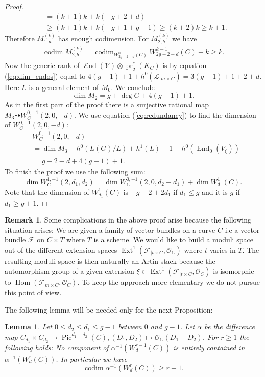 \documentclass[12pt]{extarticle}
\newtheorem{lemma}[theorem]{Lemma}
\theoremstyle{definition}
\newtheorem{remark}[theorem]{Remark}
\numberwithin{theorem}{section}
\newcommand{\OO}{\mathcal{O}}
\newcommand{\cL}{\mathcal{L}}
\newcommand{\cV}{\mathcal{V}}
\newcommand{\cF}{\mathcal{F}}
\newcommand{\op}{\operatorname}
\DeclareMathOperator{\End}{\mathcal{E}nd}
\begin{document}
\begin{proof}
\begin{align*}
&= (k+1)k + k(-g+2+d)\\
&\geq (k+1)k + k(-g+1+g-1)
\geq (k+2)k \geq k+1.
\end{align*}
Therefore $M^{(k)}_{1,a}$ has enough codimension. For $M^{(k)}_{2,b}$ we have
\begin{align*}
\op{codim} M^{(k)}_{2,b} = \op{codim}_{W^0_{2g-2-d}(C)}W^{k-1}_{2g-2-d}(C) + k \geq k.
\end{align*}
Now the generic rank of $\End(\cV)\otimes \op{pr}_2^*(K_C)$ is by equation (\ref{eq:dim_endos}) equal to $4(g-1) + 1 + h^0(\cL_{|m\times C}) = 3(g-1)+ 1 +2+d$. Here $L$ is a general element of $M_0$. We conclude
\begin{equation}
\dim M_2 = g +\deg G + 4(g-1)+1.
\end{equation}
As in the first part of the proof there is a surjective rational map $M_3 \dashrightarrow W_C^{0,-1}(2,0,-d)$. We use equation (\ref{eq:redundancy}) to find the dimension of $W_C^{0,-1}(2,0,-d)$:
\begin{align*}
&W_C^{0,-1}(2,0,-d) \\
&= \dim M_3 -h^0(L(G)/L)+h^1(L) -1 - h^0(\op{End}_0(V_\xi)) \\
&= g-2 - d + 4(g-1) + 1.
\end{align*}
To finish the proof we use the following sum: 
\begin{equation*}
	\dim W_C^{1,-1}(2,d_1,d_2) = \dim W_C^{0,-1}(2,0,d_2-d_1) + \dim W^1_{d_1}(C).
\end{equation*}
Note that the dimension of $W^1_{d_1}(C)$ is $-g-2+2d_1$ if $d_1 \leq g$ and it is $g$ if $d_1 \geq g+1$.
\end{proof}
\begin{remark}\label{remark:ext}
Some complications in the above proof arise because the following situation arises: We are given a family of vector bundles on a curve $C$ i.e a vector bundle $\cF$ on $C \times T$ where $T$ is a scheme. We would like to build a moduli space out of the different extension spaces $\op{Ext}^1(\cF_{|t \times C},\OO_{C})$ where $t$ varies in $T$. The resulting moduli space is then naturally an Artin stack because the automorphism group of a given extension $\xi \in \op{Ext}^1(\cF_{|t \times C},\OO_{C})$ is isomorphic to $\op{Hom}(\cF_{m\times C},\OO_C)$. To keep the approach more elementary we do not pursue this point of view.
\end{remark}
The following lemma will be needed only for the next Proposition:
\begin{lemma}\label{lemma:difference_loci}
Let $0\leq d_2\leq d_1\leq g-1$ between $0$ and $g-1$. Let $\alpha$ be the difference map $C_{d_1}\times C_{d_2}\to \op{Pic}^{d_1-d_2}(C), (D_1,D_2)\mapsto \OO_C(D_1-D_2)$. For $r\geq 1$ the following holds: No component of $\alpha^{-1}(W^{r-1}_d(C))$ is entirely contained in $\alpha^{-1}(W^r_d(C))$. In particular we have
 \begin{equation*}
\op{codim} \alpha^{-1}(W^r_d(C)) \geq r+1.
\end{equation*} 
\end{lemma}
\end{document}
